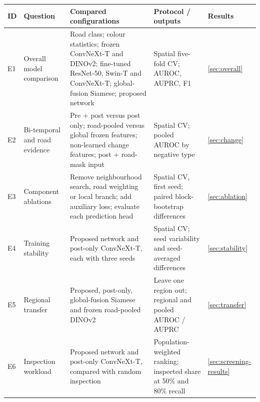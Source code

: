 \begin{tabularx}{\textwidth}{>{\raggedright\arraybackslash}p{0.5cm}>{\raggedright\arraybackslash}p{2.4cm}X>{\raggedright\arraybackslash}p{2.25cm}>{\raggedright\arraybackslash}p{1.2cm}}
\toprule
\textbf{ID} & \textbf{Question} & \textbf{Compared configurations} & \textbf{Protocol / outputs} & \textbf{Results} \\
\midrule
E1 & Overall model comparison & Road class; colour statistics; frozen ConvNeXt-T and DINOv2; fine-tuned ResNet-50, Swin-T and ConvNeXt-T; global-fusion Siamese; proposed network & Spatial five-fold CV; AUROC, AUPRC, F1 & \ref{sec:overall} \\
E2 & Bi-temporal and road evidence & Pre + post versus post only; road-pooled versus global frozen features; non-learned change features; post + road-mask input & Spatial CV; pooled AUROC by negative type & \ref{sec:change} \\
E3 & Component ablations & Remove neighbourhood search, road weighting or local branch; add auxiliary loss; evaluate each prediction head & Spatial CV, first seed; paired block-bootstrap differences & \ref{sec:ablation} \\
E4 & Training stability & Proposed network and post-only ConvNeXt-T, each with three seeds & Spatial CV; seed variability and seed-averaged differences & \ref{sec:stability} \\
E5 & Regional transfer & Proposed, post-only, global-fusion Siamese and frozen road-pooled DINOv2 & Leave one region out; regional and pooled AUROC / AUPRC & \ref{sec:transfer} \\
E6 & Inspection workload & Proposed network and post-only ConvNeXt-T, compared with random inspection & Population-weighted ranking; inspected share at 50\% and 80\% recall & \ref{sec:screening-results} \\
\bottomrule
\end{tabularx}

